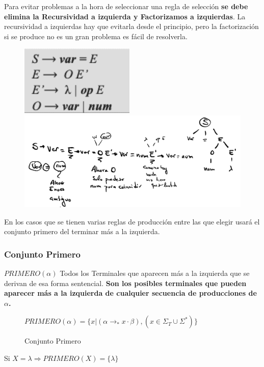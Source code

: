 \documentclass[12pt]{report} %
\begin{document}
Para evitar problemas a la hora de seleccionar una regla de selección
\textbf{se debe elimina la Recursividad a izquierda y Factorizamos a
izquierdas}. La recursividad a izquierdas hay que evitarla desde el
principio, pero la factorización si se produce no es un gran problema es
fácil de resolverla.

\begin{figure}[H]
	{\includegraphics[scale=.4]{image-20210312125711682.png}
	\includegraphics[scale=.2]{image-20210312125654582.png}}
\end{figure}

En los casos que se tienen varias reglas de producción entre las que
elegir usará el conjunto primero del terminar más a la izquierda.


\subsubsection{Conjunto Primero}

\(PRIMERO(\alpha)\) Todos los Terminales que aparecen más a la izquierda
que se derivan de esa forma sentencial. \textbf{Son los posibles
terminales que pueden aparecer más a la izquierda de cualquier secuencia
de producciones de \(\alpha\).} 
\begin{figure}[H]
  $PRIMERO(\alpha)=\{ x | (\alpha \rightarrow _* x \cdot \beta), (x \in \Sigma_T \cup \Sigma^*)\}$

  \captionsetup{justification=centering}
  \caption{Conjunto Primero}
\end{figure}
Si \(X=\lambda \Rightarrow PRIMERO(X)=\{\lambda\}\)
\end{document}
